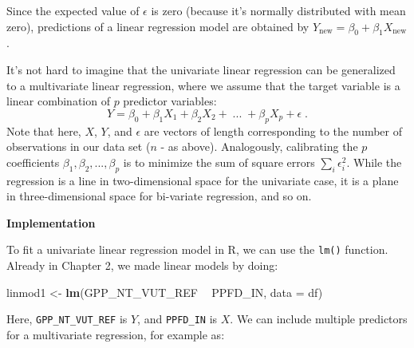 \documentclass[
]{book}
\newenvironment{Shaded}{\begin{snugshade}}{\end{snugshade}}
\newcommand{\CommentTok}[1]{\textcolor[rgb]{0.56,0.35,0.01}{\textit{#1}}}
\newcommand{\DataTypeTok}[1]{\textcolor[rgb]{0.13,0.29,0.53}{#1}}
\newcommand{\KeywordTok}[1]{\textcolor[rgb]{0.13,0.29,0.53}{\textbf{#1}}}
\newcommand{\NormalTok}[1]{#1}
\newcommand{\OperatorTok}[1]{\textcolor[rgb]{0.81,0.36,0.00}{\textbf{#1}}}
\newcommand{\StringTok}[1]{\textcolor[rgb]{0.31,0.60,0.02}{#1}}
\begin{document}
Since the expected value of \(\epsilon\) is zero (because it's normally distributed with mean zero), predictions of a linear regression model are obtained by \(Y_\text{new} = \beta_0 + \beta_1 X_\text{new}\).

It's not hard to imagine that the univariate linear regression can be generalized to a multivariate linear regression, where we assume that the target variable is a linear combination of \(p\) predictor variables:
\[
Y = \beta_0 + \beta_1 X_1 + \beta_2 X_2 + \; ... \; + \beta_p X_p + \epsilon \;.
\]
Note that here, \(X\), \(Y\), and \(\epsilon\) are vectors of length corresponding to the number of observations in our data set (\(n\) - as above). Analogously, calibrating the \(p\) coefficients \(\beta_1, \beta_2, ..., \beta_p\) is to minimize the sum of square errors \(\sum_i \epsilon_i^2\). While the regression is a line in two-dimensional space for the univariate case, it is a plane in three-dimensional space for bi-variate regression, and so on.

\textbf{Implementation}

To fit a univariate linear regression model in R, we can use the \texttt{lm()} function. Already in Chapter 2, we made linear models by doing:

\begin{Shaded}
\end{Shaded}

\begin{Shaded}
\begin{Highlighting}[]
\NormalTok{linmod1 <-}\StringTok{ }\KeywordTok{lm}\NormalTok{(GPP_NT_VUT_REF }\OperatorTok{~}\StringTok{ }\NormalTok{PPFD_IN, }\DataTypeTok{data =}\NormalTok{ df)}
\end{Highlighting}
\end{Shaded}

Here, \texttt{GPP\_NT\_VUT\_REF} is \(Y\), and \texttt{PPFD\_IN} is \(X\). We can include multiple predictors for a multivariate regression, for example as:
\end{document}
